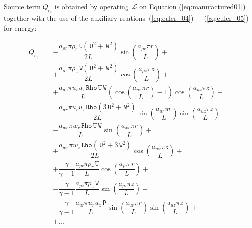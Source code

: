 \documentclass[10pt]{article}
\newcommand{\Lo}{\,\mathcal{L}}
\newcommand{\Rho}{\,\mathtt{Rho}}
\newcommand{\PP}{\,\mathtt{P}}
\newcommand{\U}{\,\mathtt{U}}
\newcommand{\W}{\,\mathtt{W}}
\begin{document}
Source term $Q_{e_t}$ is obtained by operating $\Lo$ on Equation  (\ref{eq:manufactured01}) together with the use of the  auxiliary relations~(\ref{eq:euler_04})~--~(\ref{eq:euler_05}) for energy:

\begin{equation*}
 \begin{split}
 \displaystyle
Q_{e_t}  =
&-\dfrac{ a_{\rho r} \pi \rho_r \U(\U^2+\W^2) }{2L}\sin\left(\dfrac{a_{\rho r} \pi r}{L}\right)+ \\
&+\dfrac{ a_{\rho z} \pi \rho_z \W(\U^2+\W^2) }{2L}\cos\left(\dfrac{a_{\rho z} \pi z}{L}\right)+ \\
&+\dfrac{a_{uz} \pi u_r u_z \Rho \U \W }{L}\left( \cos\left(\dfrac{a_{ur} \pi r}{L}\right) -1 \right) \cos\left(\dfrac{a_{uz} \pi z}{L}\right)+ \\
&-\dfrac{a_{ur} \pi u_r u_z \Rho(3 \U^2+\W^2)}{2L} \sin\left(\dfrac{a_{ur} \pi r}{L}\right) \sin\left(\dfrac{a_{uz} \pi z}{L}\right)+ \\
&-\dfrac{a_{wr} \pi w_r \Rho \U \W }{L}\sin\left(\dfrac{a_{wr} \pi r}{L}\right)+ \\
&+\dfrac{a_{wz} \pi w_z \Rho(\U^2+3 \W^2) }{2L}\cos\left(\dfrac{a_{wz} \pi z}{L}\right)+ \\
&+\dfrac{\gamma}{\gamma-1}\dfrac{a_{pr} \pi p_r \U }{L} \cos\left(\dfrac{a_{pr} \pi r}{L}\right)+ \\
&-\dfrac{\gamma}{\gamma-1}\dfrac{ a_{pz} \pi p_z \W}{L} \sin\left(\dfrac{a_{pz} \pi z}{L}\right)+ \\
&-\dfrac{\gamma}{\gamma-1}\dfrac{a_{ur} \pi u_r u_z \PP }{L} \sin\left(\dfrac{a_{ur} \pi r}{L}\right) \sin\left(\dfrac{a_{uz} \pi z}{L}\right)+ \\
&+...\\
\end{split}
\end{equation*}
\end{document}
